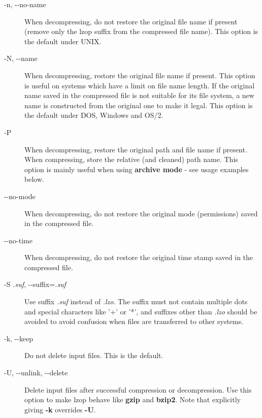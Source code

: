 \begin{description}
\item[{-n, -{}-no-name}] \mbox{}

When decompressing, do not restore the original
file name if present (remove only the lzop suffix
from the compressed file name). This option is the
default under UNIX.


\item[{-N, -{}-name}] \mbox{}

When decompressing, restore the original file name
if present. This option is useful on systems which
have a limit on file name length. If the original name saved in
the compressed file is not suitable for its file system, a
new name is constructed from the original one to make it
legal.
This option is the default under DOS, Windows and OS/2.


\item[{-P}] \mbox{}

When decompressing, restore the original path and file name if present.
When compressing, store the relative (and cleaned) path name.
This option is mainly useful when using \textbf{archive mode} - see
usage examples below.


\item[{-{}-no-mode}] \mbox{}

When decompressing, do not restore the original
mode (permissions) saved in the compressed file.


\item[{-{}-no-time}] \mbox{}

When decompressing, do not restore the original
time stamp saved in the compressed file.


\item[{-S \textit{.suf}, -{}-suffix=\textit{.suf}}] \mbox{}

Use suffix \textit{.suf} instead of \textit{.lzo}. The suffix must
not contain multiple dots and special characters like '+' or '*',
and suffixes other than \textit{.lzo} should be avoided to avoid confusion
when files are transferred to other systems.


\item[{-k, -{}-keep}] \mbox{}

Do not delete input files. This is the default.


\item[{-U, -{}-unlink, -{}-delete}] \mbox{}

Delete input files after successful compression or
decompression. Use this option to make lzop behave
like \textbf{gzip} and \textbf{bzip2}.
Note that explicitly giving \textbf{-k} overrides \textbf{-U}.



\end{description}
